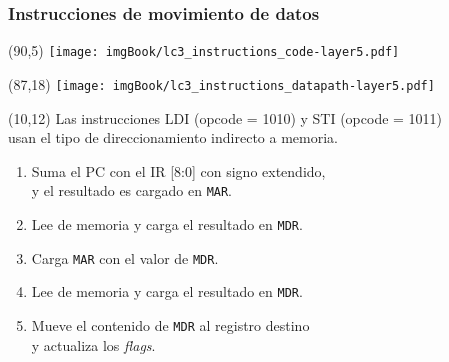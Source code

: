 \documentclass[aspectratio=169]{beamer}
\begin{document}
\begin{frame}[t,fragile]
    \frametitle{Instrucciones de movimiento de datos}
    \begin{textblock}{65}(90,5) \texttt{[image: imgBook/lc3\_instructions\_code-layer5.pdf]} \end{textblock}
    \begin{textblock}{65}(87,18) \texttt{[image: imgBook/lc3\_instructions\_datapath-layer5.pdf]} \end{textblock}
    \begin{textblock}{85}(10,12)
    \small
    Las instrucciones LDI (opcode = 1010) y STI (opcode = 1011)\\ usan el tipo de direccionamiento indirecto a memoria.\\
    \vspace{0.2cm}
    \begin{enumerate}
    \footnotesize
    \setlength\itemsep{0cm}
     \item<4-> Suma el PC con el IR [8:0] con signo extendido,\\ y el resultado es cargado en \texttt{MAR}.
     \item<5-> Lee de memoria y carga el resultado en \texttt{MDR}.
     \item<6-> Carga \texttt{MAR} con el valor de \texttt{MDR}.
     \item<7-> Lee de memoria y carga el resultado en \texttt{MDR}.
     \item<8-> Mueve el contenido de \texttt{MDR} al registro destino\\ y actualiza los \emph{flags}.
    \end{enumerate}
    \vspace{-.2cm}
    \end{textblock}
\end{frame}
\end{document}
